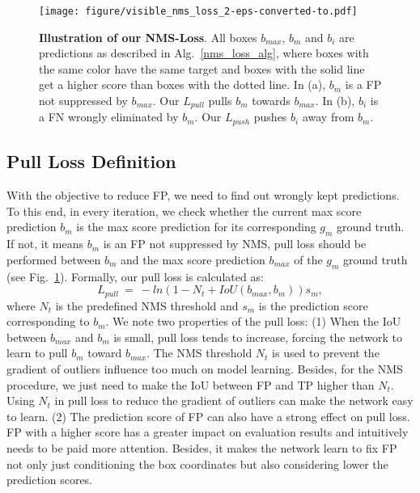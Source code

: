 \documentclass[sigconf]{acmart}
\begin{document}
\begin{figure}[t!]
\centering
\texttt{[image: figure/visible\_nms\_loss\_2-eps-converted-to.pdf]}
\vspace{-3mm}
\caption{\textbf{Illustration of our NMS-Loss}. All boxes $b_{max}$, $b_{m}$ and $b_{i}$ are predictions as described in Alg.~\ref{nms_loss_alg}, where boxes with the same color have the same target and boxes with the solid line get a higher score than boxes with the dotted line. In (a), $b_{m}$ is a FP not suppressed by $b_{max}$. Our $L_{pull}$ pulls $b_{m}$ towards $b_{max}$. In (b), $b_{i}$ is a FN wrongly eliminated by $b_{m}$. Our $L_{push}$ pushes $b_{i}$ away from $b_{m}$.}
\vspace{-3mm}
\label{visible_nms_loss}
\end{figure}

\subsection{Pull Loss Definition}
With the objective to reduce FP, we need to find out wrongly kept predictions. To this end, in every iteration, we check whether the current max score prediction $b_{m}$ is the max score prediction for its corresponding $g_{m}$ ground truth. If not, it means $b_{m}$ is an FP not suppressed by NMS, pull loss should be performed between $b_{m}$ and the max score prediction $b_{max}$ of the $g_{m}$ ground truth (see Fig.~\ref{visible_nms_loss}). Formally, our pull loss is calculated as:
\begin{equation}
L_{pull}\ =\ -ln(1-N_{t}+IoU(b_{max},b_{m}))s_{m},
\label{Pull_Loss}
\end{equation}
where $N_{t}$ is the predefined NMS threshold and $s_{m}$ is the prediction score corresponding to $b_{m}$. We note two properties of the pull  loss: (1) When the IoU between $b_{max}$ and $b_{m}$ is small, pull loss tends to increase, forcing the network to learn to pull $b_{m}$ toward $b_{max}$. The NMS threshold $N_{t}$ is used to prevent the gradient of outliers influence too much on model learning. Besides, for the NMS procedure, we just need to make the IoU between FP and TP higher than $N_{t}$. Using $N_{t}$ in pull loss to reduce the gradient of outliers can make the network easy to learn. (2) The prediction score of FP can also have a strong effect on pull loss. FP with a higher score has a greater impact on evaluation results and intuitively needs to be paid more attention. Besides, it makes the network learn to fix FP not only just conditioning the box coordinates but also considering lower the prediction scores.
\end{document}
